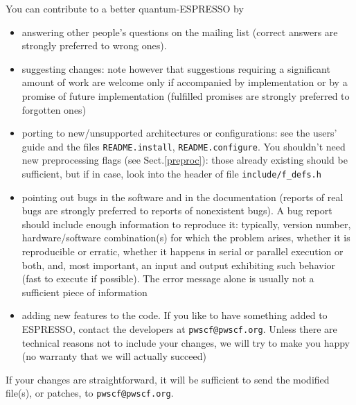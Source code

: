 \documentclass[12pt,a4paper]{article}
\makeatletter
\def\developersmail{\texttt{pwscf@pwscf.org}}
\makeatother
\begin{document}
You can contribute to a better quantum-ESPRESSO by
\begin{itemize}
\item answering other people's questions on the mailing list
  (correct answers are strongly preferred to wrong ones).
\item 
  suggesting changes: note however that suggestions requiring a
  significant amount of work are welcome only if accompanied by
  implementation or by a promise of future implementation
  (fulfilled promises are strongly preferred to forgotten ones)
\item 
  porting to new/unsupported architectures or configurations:
  see the users' guide and the files \texttt{README.install}, 
  \texttt{README.configure}.
  You shouldn't need new preprocessing flags (see Sect.\ref{preproc}):
  those already existing should be sufficient, but if in case, 
  look into the header of file \texttt{include/f\_defs.h}
\item
  pointing out bugs in the software and in the documentation
  (reports of real bugs are strongly preferred to reports of
  nonexistent bugs). A bug report should include enough information
  to reproduce it: typically, version number, hardware/software
  combination(s) for which the problem arises, whether it is 
  reproducible or erratic, whether it happens in serial or parallel 
  execution or both, and, most important, an input and output 
  exhibiting such behavior (fast to execute if possible). The error
  message alone is usually not a sufficient piece of information
\item
  adding new features to the code. If you like to have something added
  to ESPRESSO, contact the developers at \developersmail. Unless there
  are technical reasons not to include your changes, we will try to
  make you happy (no warranty that we will actually succeed)
\end{itemize}
  If your changes are straightforward, it will be sufficient to send 
  the modified file(s), or patches, to \developersmail.
\end{document}
